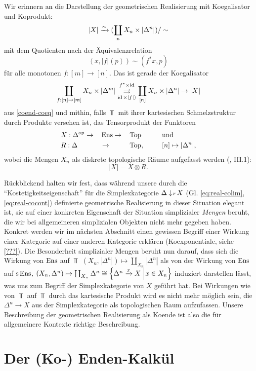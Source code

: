 Wir erinnern an die Darstellung der geometrischen Realisierung mit
Koegalisator und Koprodukt:
\[ |X| \xrightarrow[]{\sim} (\coprod_n X_n \times |\Delta^n|) / \sim \]
mit dem Quotienten nach der Äquivalenzrelation
\[ (x, |f|(p)) \sim (f^* x, p) \]
für alle monotonen $f: [m] \to [n]$. Das ist gerade der Koegalisator
 \[ \coprod_{f: [n] \to [m]} X_n \times |\Delta^m|
 \overset{f^* \times \operatorname{id}}{\underset{\operatorname{id} \times |f|)}{\rightrightarrows}}
 \coprod_{[n]} X_n \times |\Delta^n| \to |X| \]
aus \ref{coend-coeq} und mithin, falls $\Top$ mit ihrer kartesischen
Schmelzstruktur durch Produkte versehen ist, das Tensorprodukt der
Funktoren
\begin{alignat*}{4}
  &X: \Delta^\mathrm{op} \to &&\operatorname{Ens} \to &&\operatorname{Top} \qquad &&\text{und} \\
  &R: \Delta &&\to &&\operatorname{Top}, && [n] \mapsto |\Delta^n|,
\end{alignat*}
wobei die Mengen $X_n$ als diskrete topologische Räume aufgefasst
werden (\cite{Moer}, III.1):
\[ |X| = X \otimes R. \]

\begin{bem} \label{coend-correct-real}
  Rückblickend halten wir fest, dass während unsere durch die
  ``Kostetigkeitseigenschaft'' für die Simplexkategorie
  $\Delta \downarrow \! {\scriptstyle r} \, X$ (Gl. \ref{eq:real-colim},
  \ref{eq:real-cocont}) definierte geometrische Realisierung in dieser
  Situation elegant ist, sie auf einer konkreten Eigenschaft der
  Situation simplizialer \emph{Mengen} beruht, die wir bei
  allgemeineren simplizialen Objekten nicht mehr gegeben
  haben. Konkret werden wir im nächsten Abschnitt einen gewissen
  Begriff einer Wirkung einer Kategorie auf einer anderen Kategorie
  erklären (Koexponentiale, siehe \ref{???}). Die Besonderheit
  simplizialer Mengen beruht nun darauf, dass sich die Wirkung von
  $\operatorname{Ens}$ auf $\Top$ $(X_n, |\Delta^n|) \mapsto \coprod_{X_n}
  |\Delta^n|$ als von der Wirkung von $\operatorname{Ens}$ auf $\operatorname{s}\operatorname{Ens}$, $(X_n,
  \Delta^n) \mapsto \coprod_{X_n} \Delta^n \cong \left\{ \Delta^n
    \xrightarrow{x} X \,\middle|\, x \in X_n \right\}$ induziert darstellen lässt, was uns
  zum Begriff der Simplexkategorie von $X$ geführt hat. Bei Wirkungen
  wie von $\Top$ auf $\Top$ durch das kartesische Produkt wird es
  nicht mehr möglich sein, die $\Delta^n \to X$ aus der
  Simplexkategorie als topologischen Raum aufzufassen. Unsere
  Beschreibung der geometrischen Realisierung als Koende ist also die
  für allgemeinere Kontexte richtige Beschreibung.
\end{bem}

\section{Der (Ko-) Enden-Kalkül}

